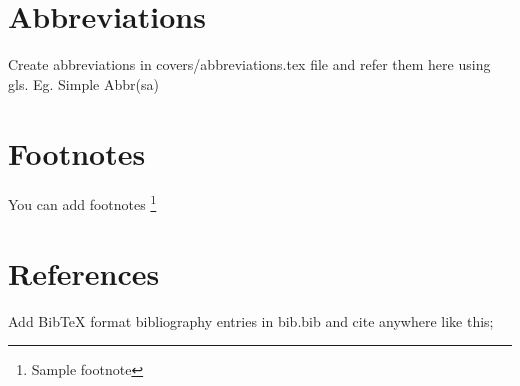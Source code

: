 \section{Abbreviations}
Create abbreviations in covers/abbreviations.tex file and refer them here using gls. Eg. Simple Abbr(\gls{sa})

\section{Footnotes}
You can add footnotes \footnote{Sample footnote}

\section{References}
Add BibTeX format bibliography entries in bib.bib and cite anywhere like this; \cite{sample_cite}